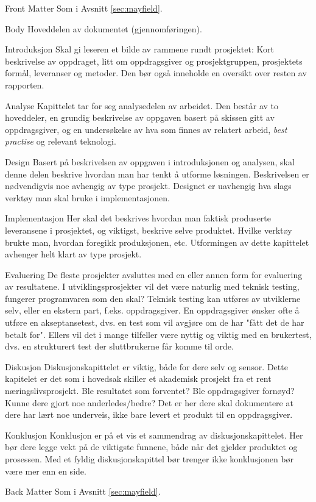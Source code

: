 \begin{compactdesc}
\item [Front Matter]  Som i Avsnitt \ref{sec:mayfield}.

\item [Body] Hoveddelen av dokumentet (gjennomføringen).
\begin{compactdesc}
\item [Introduksjon] Skal gi leseren et bilde av rammene rundt prosjektet: Kort beskrivelse av oppdraget, litt om oppdragsgiver og prosjektgruppen, prosjektets formål, leveranser og metoder. Den bør også inneholde en oversikt over resten av rapporten. 
\item [Analyse] Kapittelet tar for seg analysedelen av arbeidet. Den består av to hoveddeler, en grundig beskrivelse av oppgaven basert på skissen gitt av oppdragsgiver, og en undersøkelse av hva som finnes av relatert arbeid, {\em best practise} og relevant teknologi. 
\item [Design]  Basert på beskrivelsen av oppgaven i introduksjonen  og analysen, skal denne delen beskrive hvordan man har tenkt å utforme løsningen. Beskrivelsen er nødvendigvis noe avhengig av type prosjekt. Designet er uavhengig hva slags verktøy man skal bruke i implementasjonen.
\item [Implementasjon] Her skal det beskrives hvordan man faktisk produserte leveransene i prosjektet, og viktigst, beskrive selve produktet. Hvilke verktøy brukte man, hvordan foregikk produksjonen, etc. Utformingen av dette kapittelet avhenger helt klart av type prosjekt.
\item [Evaluering] De fleste prosjekter avsluttes med en eller annen form for evaluering av resultatene. I utviklingsprosjekter vil det være naturlig med teknisk testing, fungerer programvaren som den skal? Teknisk testing kan utføres av utviklerne selv, eller en ekstern part, f.eks. oppdragsgiver. En oppdragsgiver ønsker ofte å utføre en akseptansetest, dvs. en test som vil avgjøre om de har "fått det de har betalt for". Ellers vil det i mange tilfeller være nyttig og viktig med en brukertest, dvs. en strukturert test der sluttbrukerne får komme til orde. 
\item [Diskusjon] Diskusjonskapittelet er viktig, både for dere selv og sensor. Dette kapitelet er det som i hovedsak skiller et akademisk prosjekt fra et rent næringslivsprosjekt. Ble resultatet som forventet? Ble oppdragsgiver fornøyd? Kunne dere gjort noe anderledes/bedre?
Det er her dere skal dokumentere at dere har lært noe underveis, ikke bare levert et produkt til en oppdragsgiver. 
\item [Konklusjon] Konklusjon er på et vis et sammendrag av diskusjonskapittelet. Her bør dere legge vekt på de viktigste funnene, både når det gjelder produktet og prosessen. Med et fyldig diskusjonskapittel bør trenger ikke konklusjonen bør være mer enn en side.
\end{compactdesc}

\item [Back Matter] Som i Avsnitt \ref{sec:mayfield}.

\end{compactdesc}

